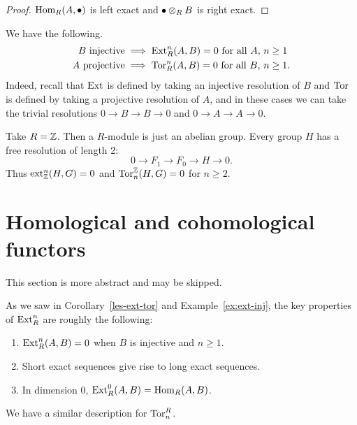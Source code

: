 \begin{proof}
$\operatorname{Hom}_R(A,\bullet)$ is left exact and $\bullet \otimes_R B$ is right exact.
\end{proof}
\begin{ex}
We have the following.
\begin{align*}
B\text{ injective}&\implies \operatorname{Ext}^n_R(A,B)=0\text{ for all }A,\, n\ge 1\\
A\text{ projective}&\implies \operatorname{Tor}^n_R(A,B)=0\text{ for all }B,\,n\ge 1.
\end{align*}
Indeed, recall that $\operatorname{Ext}$ is defined by taking an injective resolution of $B$ and $\operatorname{Tor}$ is defined by taking a projective resolution of $A$, and in these cases we can take the trivial resolutions $0\to B\to B\to 0$ and $0\to A\to A \to 0$.
\end{ex}
\begin{ex}
Take $R=\mathbb{Z}$. Then a $R$-module is just an abelian group. Every group $H$ has a free resolution of length 2:
\[
0\to F_1\to F_0\to H\to 0.
\]
Thus $\operatorname{ext}^n_{\mathbb{Z}}(H,G)=0$ and $\operatorname{Tor}_n^{\mathbb{Z}}(H,G)=0$ for $n\ge 2$.
\end{ex}
\section{Homological and cohomological functors}
This section is more abstract and may be skipped.

As we saw in Corollary~\ref{les-ext-tor} and Example~\ref{ex:ext-inj}, the key properties of $\operatorname{Ext}^n_R$ are roughly the following:
\begin{enumerate}
\item
$\operatorname{Ext}_R^n(A,B)=0$ when $B$ is injective and $n\ge 1$.
\item
Short exact sequences give rise to long exact sequences.
\item
In dimension 0, $\operatorname{Ext}_R^0(A,B)=\operatorname{Hom}_R(A,B)$.
\end{enumerate}
We have a similar description for $\operatorname{Tor}^R_n$.

